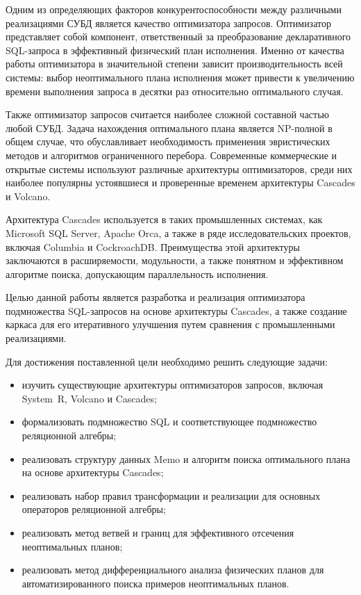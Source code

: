 \documentclass[fontsize=14pt, russian]{scrartcl}
\begin{document}
Одним из определяющих факторов конкурентоспособности между различными
реализациями СУБД является качество оптимизатора запросов. Оптимизатор
представляет собой компонент, ответственный за преобразование декларативного
SQL-запроса в эффективный физический план исполнения. Именно от качества работы
оптимизатора в значительной степени зависит производительность всей системы:
выбор неоптимального плана исполнения может привести к увеличению времени
выполнения запроса в десятки раз относительно оптимального случая.

Также оптимизатор запросов считается наиболее сложной составной частью любой
СУБД. Задача нахождения оптимального плана является NP-полной в общем случае,
что обуславливает необходимость применения эвристических методов и алгоритмов
ограниченного перебора. Современные коммерческие и открытые системы используют
различные архитектуры оптимизаторов, среди них наиболее популярны устоявшиеся и
проверенные временем архитектуры Cascades и Volcano.

Архитектура Cascades используется в таких промышленных системах, как Microsoft
SQL Server, Apache Orca, а также в ряде исследовательских проектов, включая
Columbia и CockroachDB\@. Преимущества этой архитектуры заключаются в
расширяемости, модульности, а также понятном и эффективном алгоритме поиска,
допускающим параллельность исполнения.

Целью данной работы является разработка и реализация оптимизатора подмножества
SQL-запросов на основе архитектуры Cascades, а также создание каркаса для его
итеративного улучшения путем сравнения с промышленными реализациями.

Для достижения поставленной цели необходимо решить следующие задачи:
\begin{itemize}
  \item изучить существующие архитектуры оптимизаторов запросов, включая
        System~R, Volcano и Cascades;
  \item формализовать подмножество SQL и соответствующее подмножество
        реляционной алгебры;
  \item реализовать структуру данных Memo и алгоритм поиска оптимального плана
        на основе архитектуры Cascades;
  \item реализовать набор правил трансформации и реализации для основных
        операторов реляционной алгебры;
  \item реализовать метод ветвей и границ для эффективного отсечения
        неоптимальных планов;
  \item реализовать метод дифференциального анализа физических планов для
        автоматизированного поиска примеров неоптимальных планов.
\end{itemize}
\end{document}
